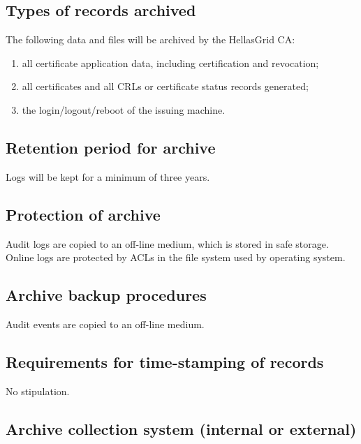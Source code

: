 \subsection{Types of records archived}

The following data and files will be archived by the HellasGrid CA:

\begin{enumerate}
\item{all certificate application data, including certification and revocation;}
\item{all certificates and all CRLs or certificate status records generated;}
\item{the login/logout/reboot of the issuing machine.}
\end{enumerate}

\subsection{Retention period for archive}

Logs will be kept for a minimum of three years.

\subsection{Protection of archive}

Audit logs are copied to an off-line medium, which is stored in safe storage. Online logs are protected by ACLs in the file system used by operating system.

\subsection{Archive backup procedures}

Audit events are copied to an off-line medium.

\subsection{Requirements for time-stamping of records}

No stipulation. 

\subsection{Archive collection system (internal or external)}

